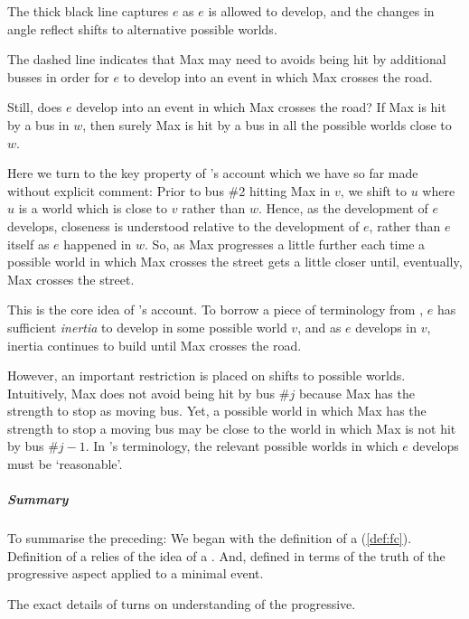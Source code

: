 \begin{note}
  The thick black line captures \(e\) as \(e\) is allowed to develop, and the changes in angle reflect shifts to alternative possible worlds.

  The dashed line indicates that Max may need to avoids being hit by additional busses in order for \(e\) to develop into an event in which Max crosses the road.

  Still, does \(e\) develop into an event in which Max crosses the road?
  If Max is hit by a bus in \(w\), then surely Max is hit by a bus in all the possible worlds close to \(w\).

  Here we turn to the key property of \citeauthor{Landman:1992wh}'s account which we have so far made without explicit comment:
  Prior to bus \#2 hitting Max in \(v\), we shift to \(u\) where \(u\) is a world which is close to \(v\) rather than \(w\).
  Hence, as the development of \(e\) develops, closeness is understood relative to the development of \(e\), rather than \(e\) itself as \(e\) happened in \(w\).
  So, as Max progresses a little further each time a possible world in which Max crosses the street gets a little closer until, eventually, Max crosses the street.

  This is the core idea of \citeauthor{Landman:1992wh}'s account.
  To borrow a piece of terminology from \textcite{Dowty:1979vq}, \(e\) has sufficient \emph{inertia} to develop in some possible world \(v\), and as \(e\) develops in \(v\), inertia continues to build until Max crosses the road.

  However, an important restriction is placed on shifts to possible worlds.
  Intuitively, Max does not avoid being hit by bus \#\(j\) because Max has the strength to stop as moving bus.
  Yet, a possible world in which Max has the strength to stop a moving bus may be close to the world in which Max is not hit by bus \#\(j - 1\).
  In \citeauthor{Landman:1992wh}'s terminology, the relevant possible worlds in which \(e\) develops must be `reasonable'.
\end{note}

\subparagraph*{Summary}

\begin{note}[Summarising]
  To summarise the preceding:
  We began with the definition of a \fc{} (\autoref{def:fc}).
  Definition of a \fc{} relies of the idea of a \pevent{}.
  And, defined \pevent{} in terms of the truth of the progressive aspect applied to a minimal event.

  The exact details of \pevent{} turns on understanding of the progressive.
\end{note}

